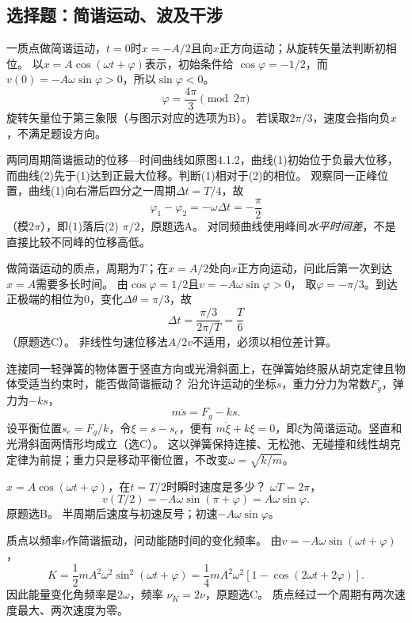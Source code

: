 \subsection{选择题：简谐运动、波及干涉}

\problemtext 一质点做简谐运动，$t=0$时$x=-A/2$且向$x$正方向运动；从旋转矢量法判断初相位。
\workings
以$x=A\cos(\omega t+\varphi)$表示，初始条件给
$\cos\varphi=-1/2$，而
$v(0)=-A\omega\sin\varphi>0$，所以$\sin\varphi<0$。
\[
\boxed{\varphi=\frac{4\pi}{3}\pmod{2\pi}}
\]
旋转矢量位于第三象限（与图示对应的选项为B）。
\crosscheck 若误取$2\pi/3$，速度会指向负$x$，不满足题设方向。

\problemtext 两同周期简谐振动的位移—时间曲线如原图4.1.2，曲线(1)初始位于负最大位移，而曲线(2)先于(1)达到正最大位移。判断(1)相对于(2)的相位。
\workings
观察同一正峰位置，曲线(1)向右滞后四分之一周期$\Delta t=T/4$，故
\[
\boxed{\varphi_1-\varphi_2=-\omega\Delta t=-\frac{\pi}{2}}
\]
（模$2\pi$），即(1)落后(2) $\pi/2$，原题选A。
\crosscheck 对同频曲线使用峰间\emph{水平时间差}，不是直接比较不同峰的位移高低。

\problemtext 做简谐运动的质点，周期为$T$；在$x=A/2$处向$x$正方向运动，问此后第一次到达$x=A$需要多长时间。
\workings
由$\cos\varphi=1/2$且$v=-A\omega\sin\varphi>0$，
取$\varphi=-\pi/3$。到达正极端的相位为$0$，变化$\Delta\theta=\pi/3$，故
\[
\boxed{\Delta t=\frac{\pi/3}{2\pi/T}=\frac T6}
\]
（原题选C）。
\crosscheck 非线性匀速位移法$A/2v$不适用，必须以相位差计算。

\problemtext 连接同一轻弹簧的物体置于竖直方向或光滑斜面上，在弹簧始终服从胡克定律且物体受适当约束时，能否做简谐振动？
\workings
沿允许运动的坐标$s$，重力分力为常数$F_g$，弹力为$-ks$，
\[
m\ddot s=F_g-ks.
\]
设平衡位置$s_e=F_g/k$，令$\xi=s-s_e$，便有
$m\ddot\xi+k\xi=0$，即$\xi$为简谐运动。竖直和光滑斜面两情形均成立（选C）。
\crosscheck 这以弹簧保持连接、无松弛、无碰撞和线性胡克定律为前提；重力只是移动平衡位置，不改变$\omega=\sqrt{k/m}$。

\problemtext $x=A\cos(\omega t+\varphi)$，在$t=T/2$时瞬时速度是多少？
\workings
$\omega T=2\pi$，
\[
v(T/2)=-A\omega\sin(\pi+\varphi)
=\boxed{A\omega\sin\varphi}.
\]
原题选B。
\crosscheck 半周期后速度与初速反号；初速$-A\omega\sin\varphi$。

\problemtext 质点以频率$\nu$作简谐振动，问动能随时间的变化频率。
\workings
由$v=-A\omega\sin(\omega t+\varphi)$，
\[
K=\frac12mA^2\omega^2\sin^2(\omega t+\varphi)
=\frac14mA^2\omega^2[1-\cos(2\omega t+2\varphi)].
\]
因此能量变化角频率是$2\omega$，频率
$\boxed{\nu_K=2\nu}$，原题选C。
\crosscheck 质点经过一个周期有两次速度最大、两次速度为零。

